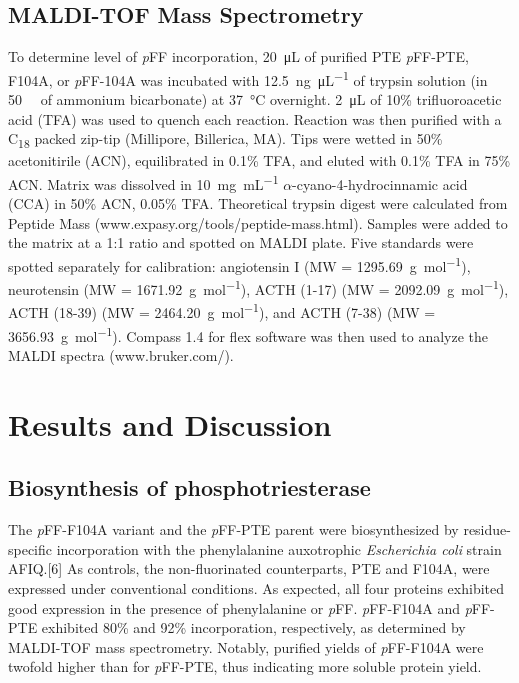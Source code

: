 \begin{refsection}
\subsection{MALDI-TOF Mass Spectrometry}

To determine level of \emph{p}FF incorporation, \SI{20}{\micro\liter} of
purified PTE \emph{p}FF-PTE, F104A, or \emph{p}FF-104A was incubated with
\SI{12.5}{\ng\per\uL} of trypsin solution (in \SI{50}{\milli\Molar} of ammonium
bicarbonate) at \SI{37}{\celsius} overnight. \SI{2}{\uL} of 10\%
trifluoroacetic acid (TFA) was used to quench each reaction. Reaction was then
purified with a C\textsubscript{18} packed zip-tip (Millipore, Billerica, MA).
Tips were wetted in 50\% acetonitirile (ACN), equilibrated in 0.1\% TFA, and
eluted with 0.1\% TFA in 75\% ACN. Matrix was dissolved in \SI{10}{\mg\per\mL}
$\alpha$-cyano-4-hydrocinnamic acid (CCA) in 50\% ACN, 0.05\% TFA. Theoretical
trypsin digest were calculated from Peptide Mass
(www.expasy.org/tools/peptide-mass.html). Samples were added to the matrix at a
1:1 ratio and spotted on MALDI plate. Five standards were spotted separately
for calibration: angiotensin I (MW = \SI{1295.69}{\g\per\mole}), neurotensin
(MW = \SI{1671.92}{\g\per\mole}), ACTH (1-17) (MW = \SI{2092.09}{\g\per\mole}),
ACTH (18-39) (MW = \SI{2464.20}{\g\per\mole}), and ACTH (7-38) (MW =
\SI{3656.93}{\g\per\mole}).  Compass 1.4 for flex software was then used to
analyze the MALDI spectra (www.bruker.com/).

\section{Results and Discussion}

\subsection{Biosynthesis of phosphotriesterase}

The \emph{p}FF-F104A variant and the \emph{p}FF-PTE parent were biosynthesized
by residue-specific incorporation with the phenylalanine auxotrophic
\emph{Escherichia coli} strain AFIQ.[6] As controls, the non-fluorinated
counterparts, PTE and F104A, were expressed under conventional conditions. As
expected, all four proteins exhibited good expression in the presence of
phenylalanine or \emph{p}FF. \emph{p}FF-F104A and \emph{p}FF-PTE exhibited 80\%
and 92\% incorporation, respectively, as determined by MALDI-TOF mass
spectrometry. Notably, purified yields of \emph{p}FF-F104A were twofold higher
than for \emph{p}FF-PTE, thus indicating more soluble protein yield.


\end{refsection}
